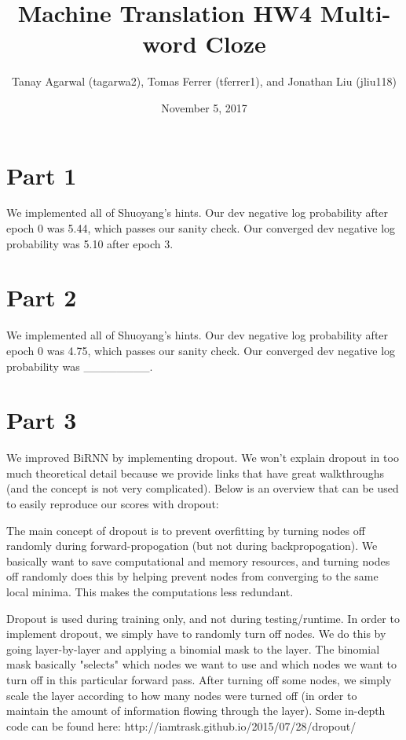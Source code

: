 \documentclass{article}
\title{Machine Translation HW4 Multi-word Cloze}
\author{Tanay Agarwal (tagarwa2), Tomas Ferrer (tferrer1), and Jonathan Liu (jliu118)}
\date{November 5, 2017}
\begin{document}
\maketitle


\section{Part 1}

We implemented all of Shuoyang's hints. Our dev negative log probability after epoch 0 was 5.44, which passes our sanity check. Our converged dev negative log probability was 5.10 after epoch 3.

\section{Part 2}

We implemented all of Shuoyang's hints. Our dev negative log probability after epoch 0 was 4.75, which passes our sanity check. Our converged dev negative log probability was ________.

\section{Part 3}

We improved BiRNN by implementing dropout. We won't explain dropout in too much theoretical detail because we provide links that have great walkthroughs (and the concept is not very complicated). Below is an overview that can be used to easily reproduce our scores with dropout:

The main concept of dropout is to prevent overfitting by turning nodes off randomly during forward-propogation (but not during backpropogation). We basically want to save computational and memory resources, and turning nodes off randomly does this by helping prevent nodes from converging to the same local minima. This makes the computations less redundant.

Dropout is used during training only, and not during testing/runtime. In order to implement dropout, we simply have to randomly turn off nodes. We do this by going layer-by-layer and applying a binomial mask to the layer. The binomial mask basically "selects" which nodes we want to use and which nodes we want to turn off in this particular forward pass. After turning off some nodes, we simply scale the layer according to how many nodes were turned off (in order to maintain the amount of information flowing through the layer). Some in-depth code can be found here: http://iamtrask.github.io/2015/07/28/dropout/
\end{document}
